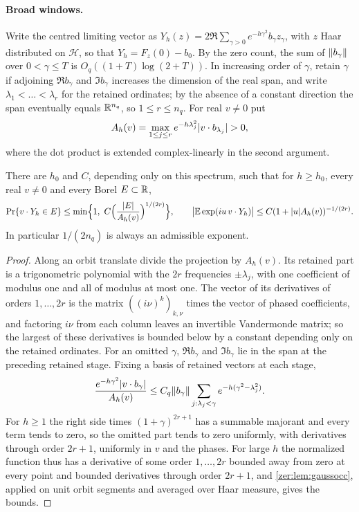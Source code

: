 \paragraph{Broad windows.}
Write the centred limiting vector as $Y_h(z)=2\Re\sum_{\gamma>0}e^{-h\gamma^2}b_\gamma z_\gamma$, with $z$
Haar distributed on $\mathcal H$, so that $Y_h=F_z(0)-b_0$. By the zero count, the sum of
$\lVert b_\gamma\rVert$ over $0<\gamma\le T$ is $O_q((1+T)\log(2+T))$. In increasing order of $\gamma$, retain
$\gamma$ if adjoining $\Re b_\gamma$ and $\Im b_\gamma$ increases the dimension of the real span, and
write $\lambda_1<\dots<\lambda_r$ for the retained ordinates; by the absence of a constant direction
the span eventually equals $\mathbb{R}^{n_q}$, so $1\le r\le n_q$. For real $v\ne0$ put
\[
 A_h(v)=\max_{1\le j\le r}e^{-h\lambda_j^2}\lvert v\cdot b_{\lambda_j}\rvert>0,
\]
where the dot product is extended complex-linearly in the second argument.

\begin{theorem}\label{zer:thm:gaussbroad}
There are $h_0$ and $C$, depending only on this spectrum, such that for $h\ge h_0$, every real
$v\ne0$ and every Borel $E\subset\mathbb{R}$,
\[
 \Pr\set{v\cdot Y_h\in E}\le\min\Bigl\{1,\ C\Bigl(\frac{\abs E}{A_h(v)}\Bigr)^{1/(2r)}\Bigr\},\qquad
 \bigl|\mathbb E\exp(iu\,v\cdot Y_h)\bigr|\le C(1+\abs uA_h(v))^{-1/(2r)} .
\]
In particular $1/(2n_q)$ is always an admissible exponent.
\end{theorem}
\begin{proof}
Along an orbit translate divide the projection by $A_h(v)$. Its retained part is a trigonometric
polynomial with the $2r$ frequencies $\pm\lambda_j$, with one coefficient of modulus one and all of
modulus at most one. The vector of its derivatives of orders $1,\dots,2r$ is the matrix
$((i\nu)^k)_{k,\nu}$ times the vector of phased coefficients, and factoring $i\nu$ from each column
leaves an invertible Vandermonde matrix; so the largest of these derivatives is bounded below by a
constant depending only on the retained ordinates. For an omitted $\gamma$, $\Re b_\gamma$ and
$\Im b_\gamma$ lie in the span at the preceding retained stage. Fixing a basis of retained vectors
at each stage,
\[
 \frac{e^{-h\gamma^2}\lvert v\cdot b_\gamma\rvert}{A_h(v)}\le C_q\lVert b_\gamma\rVert\sum_{j:\lambda_j<\gamma}e^{-h(\gamma^2-\lambda_j^2)} .
\]
For $h\ge1$ the right side times $(1+\gamma)^{2r+1}$ has a summable majorant and every term tends to
zero, so the omitted part tends to zero uniformly, with derivatives through order $2r+1$, uniformly
in $v$ and the phases. For large $h$ the normalized function thus has a derivative of some order
$1,\dots,2r$ bounded away from zero at every point and bounded derivatives through order $2r+1$, and
\cref{zer:lem:gaussocc}, applied on unit orbit segments and averaged over Haar measure, gives the
bounds.
\end{proof}

